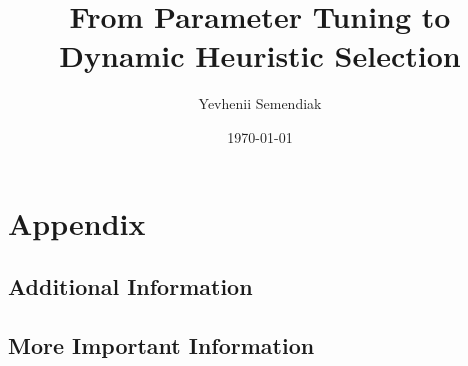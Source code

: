 \documentclass[ms, english]{stthesis}
\title{From Parameter Tuning to Dynamic Heuristic Selection}
\author{Yevhenii Semendiak}
\date{\today}
\begin{document}
  \maketitle %
  
  \tableofcontents
  
  
  
  
  
  
  
  
  
  
  
  
  
  
  
  

  \backmatter
  
  \appendix
  \chapter{Appendix}
  \section{Additional Information}
  
  \section{More Important Information}
  
\end{document}
